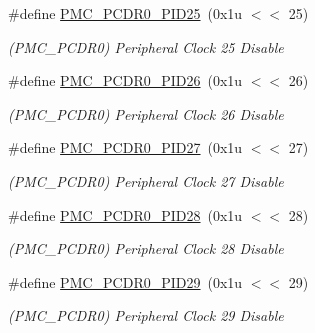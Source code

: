 \begin{DoxyCompactItemize}
\mbox{\label{group__SAMS70__PMC_ga5388a9602d3a894175478b7b06e71d76}} 
\#define \mbox{\hyperlink{group__SAMS70__PMC_ga5388a9602d3a894175478b7b06e71d76}{P\+M\+C\+\_\+\+P\+C\+D\+R0\+\_\+\+P\+I\+D25}}~(0x1u $<$$<$ 25)
\begin{DoxyCompactList}\small\item\em (P\+M\+C\+\_\+\+P\+C\+D\+R0) Peripheral Clock 25 Disable \end{DoxyCompactList}\item 
\mbox{\label{group__SAMS70__PMC_gad50968f0a06aa7996f16c45b27677d0f}} 
\#define \mbox{\hyperlink{group__SAMS70__PMC_gad50968f0a06aa7996f16c45b27677d0f}{P\+M\+C\+\_\+\+P\+C\+D\+R0\+\_\+\+P\+I\+D26}}~(0x1u $<$$<$ 26)
\begin{DoxyCompactList}\small\item\em (P\+M\+C\+\_\+\+P\+C\+D\+R0) Peripheral Clock 26 Disable \end{DoxyCompactList}\item 
\mbox{\label{group__SAMS70__PMC_ga4f9c57c50a8ed27f7ef2e66cfc882904}} 
\#define \mbox{\hyperlink{group__SAMS70__PMC_ga4f9c57c50a8ed27f7ef2e66cfc882904}{P\+M\+C\+\_\+\+P\+C\+D\+R0\+\_\+\+P\+I\+D27}}~(0x1u $<$$<$ 27)
\begin{DoxyCompactList}\small\item\em (P\+M\+C\+\_\+\+P\+C\+D\+R0) Peripheral Clock 27 Disable \end{DoxyCompactList}\item 
\mbox{\label{group__SAMS70__PMC_ga6077450b98a779a6571f10d81a03c969}} 
\#define \mbox{\hyperlink{group__SAMS70__PMC_ga6077450b98a779a6571f10d81a03c969}{P\+M\+C\+\_\+\+P\+C\+D\+R0\+\_\+\+P\+I\+D28}}~(0x1u $<$$<$ 28)
\begin{DoxyCompactList}\small\item\em (P\+M\+C\+\_\+\+P\+C\+D\+R0) Peripheral Clock 28 Disable \end{DoxyCompactList}\item 
\mbox{\label{group__SAMS70__PMC_ga45862a0e2479a91173b9a590d9551ae6}} 
\#define \mbox{\hyperlink{group__SAMS70__PMC_ga45862a0e2479a91173b9a590d9551ae6}{P\+M\+C\+\_\+\+P\+C\+D\+R0\+\_\+\+P\+I\+D29}}~(0x1u $<$$<$ 29)
\begin{DoxyCompactList}\small\item\em (P\+M\+C\+\_\+\+P\+C\+D\+R0) Peripheral Clock 29 Disable \end{DoxyCompactList}\item 
$$
\end{DoxyCompactItemize}

